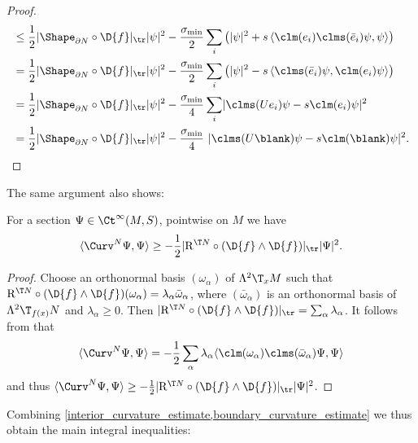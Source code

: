 \documentclass[a4paper,11pt]{amsart}
\numberwithin{equation}{section}
\begin{document}
\begin{proof}
\begin{align*}
        &\leq \frac{1}{2} \lvert \Shape_{\partial N} \circ \D{f} \rvert_{\tr} \lvert \psi \rvert^2 - \frac{\sigma_{\min}}{2} \sum_{i} \left(\lvert \psi \rvert^2 + s \left\langle \clm(e_i)\clms(\bar{e}_i)\psi, \psi \right\rangle \right) \\
        &= \frac{1}{2} \lvert \Shape_{\partial N} \circ \D{f} \rvert_{\tr} \lvert \psi \rvert^2 - \frac{\sigma_{\min}}{2} \sum_{i} \left(\lvert \psi \rvert^2 - s \left\langle \clms(\bar{e}_i)\psi, \clm(e_i) \psi \right\rangle \right)\\
        &= \frac{1}{2} \lvert \Shape_{\partial N} \circ \D{f} \rvert_{\tr} \lvert \psi \rvert^2 - \frac{\sigma_{\min}}{4} \sum_{i} \lvert \clms(U e_i) \psi - s \clm(e_i) \psi \rvert^2 \\
        &= \frac{1}{2} \lvert \Shape_{\partial N} \circ \D{f} \rvert_{\tr} \lvert \psi \rvert^2 - \frac{\sigma_{\min}}{4}\ \lvert \clms(U \blank) \psi - s \clm(\blank)\psi\rvert^2. \qedhere
    \end{align*}
\end{proof}

The same argument also shows:

\begin{lemma} \label{interior_curvature_estimate}
    For a section \(\Psi \in \Ct^\infty(M, S)\), pointwise on \(M\) we have
    \[
        \langle \Curv^N \Psi, \Psi \rangle  \geq -\frac{1}{2}\lvert \mathrm{R}^{\T N} \circ (\D{f} \wedge \D{f}) \rvert_{\tr} \lvert \Psi \rvert^2. %
    \]
 \end{lemma}
 \begin{proof}
    Choose an orthonormal basis \((\omega_\alpha)\) of \(\Lambda^2 \T_x M\) such that \(\mathrm{R}^{\T N}\circ (\D{f} \wedge \D{f})(\omega_\alpha) = \lambda_\alpha \bar{\omega}_\alpha\), where \((\bar{\omega}_\alpha)\) is an orthonormal basis of \(\Lambda^2 \T_{f(x)} N\) and \(\lambda_\alpha \geq 0\).
    Then \(\lvert \mathrm{R}^{\T N}\circ (\D{f} \wedge \D{f}) \rvert_{\tr} = \sum_{\alpha} \lambda_\alpha\).
    It follows from  that
    \[
        \langle \Curv^N \Psi, \Psi \rangle = -\frac{1}{2}\sum_{\alpha} \lambda_\alpha \langle \clm(\omega_\alpha) \clms(\bar{\omega}_\alpha) \Psi, \Psi \rangle
    \]
    and thus \(\langle \Curv^N \Psi, \Psi \rangle \geq -\frac{1}{2} \lvert \mathrm{R}^{\T N} \circ (\D{f} \wedge \D{f})\rvert_{\tr} \lvert \Psi \rvert^2\).
 \end{proof}

 Combining \cref{interior_curvature_estimate,boundary_curvature_estimate} we thus obtain the main integral inequalities:
 
\end{document}
